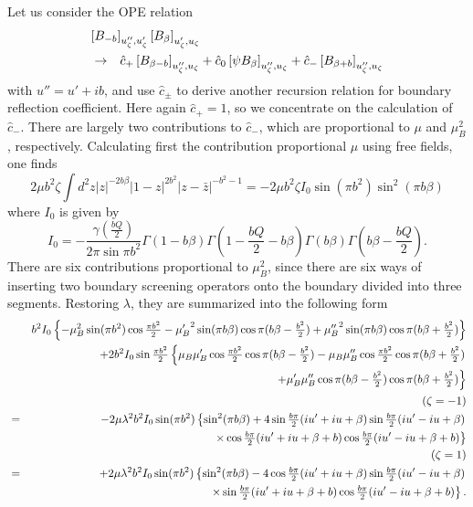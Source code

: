 \documentclass[a4paper,12pt]{article}
\newcommand{\tfrac}[2]{{\textstyle\frac{#1}{#2}}}
\begin{document}
   Let us consider the OPE relation
\begin{eqnarray}
\lefteqn{
  \left[B_{-b}\right]_{u''_\zeta,u'_\zeta}
  \left[B_\beta\right]_{u'_\zeta,u_\zeta}
}\nonumber \\ & \rightarrow &
  \hat{c}_+\left[B_{\beta-b} \right]_{u''_\zeta,u_\zeta}
 +\hat{c}_0\left[\psi B_\beta\right]_{u''_\zeta,u_\zeta}
 +\hat{c}_-\left[B_{\beta+b} \right]_{u''_\zeta,u_\zeta}
\end{eqnarray}
 with $u''=u'+ ib$, and use $\hat{c}_\pm$ to derive another
 recursion relation for boundary reflection coefficient.
 Here again $\hat{c}_+=1$, so we concentrate on the calculation
 of $\hat{c}_-$.
 There are largely two contributions to $\hat{c}_-$,
 which are proportional to $\mu$ and $\mu_B^2$, respectively.
 Calculating first the contribution proportional $\mu$
 using free fields, one finds
\begin{equation}
   2\mu b^2\zeta\int d^2z|z|^{-2b\beta}|1-z|^{2b^2}|z-\bar{z}|^{-b^2-1}
  = -2\mu b^2\zeta I_0 \sin(\pi b^2)\sin^2(\pi b\beta)
\end{equation}
 where $I_0$ is given by
\begin{equation}
  I_0 = -\frac{\gamma(\tfrac{bQ}{2})}
             {2\pi\sin\pi b^2}
  \Gamma(1-b\beta)\Gamma(1-\tfrac{bQ}{2}-b\beta)
  \Gamma(b\beta)\Gamma(b\beta-\tfrac{bQ}{2}).
\end{equation}
 There are six contributions proportional to $\mu_B^2$, since
 there are six ways of inserting two boundary screening operators
 onto the boundary divided into three segments.
 Restoring $\lambda$, they are summarized into the following form
\begin{eqnarray}
&&b^2 I_0\left\{
   -\mu_B^2 \sin(\pi b^2)\cos\tfrac{\pi b^2}{2}
   -{\mu'_B}^2\sin(\pi b\beta)\cos\pi(b\beta-\tfrac{b^2}{2})
   +{\mu''_B}^2\sin(\pi b\beta)\cos\pi(b\beta+\tfrac{b^2}{2})  
 \right\}
 \nonumber \\
&&+2b^2 I_0\sin\tfrac{\pi b^2}{2}\left\{
    \mu_B\mu'_B\cos\tfrac{\pi b^2}{2}\cos\pi(b\beta-\tfrac{b^2}{2})
   -\mu_B\mu''_B\cos\tfrac{\pi b^2}{2}\cos\pi(b\beta+\tfrac{b^2}{2})
 \right. \nonumber \\ && \left. \hskip30mm
   +\mu'_B\mu''_B\cos\pi(b\beta-\tfrac{b^2}{2})\cos\pi(b\beta+\tfrac{b^2}{2})
 \right\}
 \nonumber \\
 & & ~~(\zeta=-1) \nonumber \\
 &=& -2\mu\lambda^2b^2I_0 \sin(\pi b^2)
    \left\{
    \sin^2(\pi b\beta)
   +4\sin\tfrac{b\pi}{2}(iu'+iu+\beta) 
     \sin\tfrac{b\pi}{2}(iu'-iu+\beta) 
 \right. \nonumber \\ && \left.
  \hskip50mm \times
     \cos\tfrac{b\pi}{2}(iu'+iu+\beta+b) 
     \cos\tfrac{b\pi}{2}(iu'-iu+\beta+b) 
    \right\}
 \nonumber \\
 & & ~~(\zeta=1) \nonumber \\
 &=& +2\mu\lambda^2b^2I_0 \sin(\pi b^2)
    \left\{
    \sin^2(\pi b\beta)
   -4\cos\tfrac{b\pi}{2}(iu'+iu+\beta) 
     \sin\tfrac{b\pi}{2}(iu'-iu+\beta) 
 \right. \nonumber \\ && \left.
  \hskip50mm \times
     \sin\tfrac{b\pi}{2}(iu'+iu+\beta+b) 
     \cos\tfrac{b\pi}{2}(iu'-iu+\beta+b) 
    \right\}.
\end{eqnarray}
\end{document}

